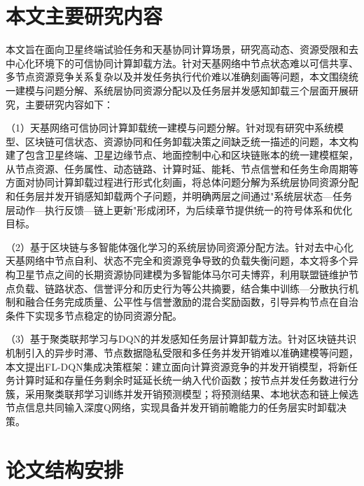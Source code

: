 \section{本文主要研究内容}

本文旨在面向卫星终端试验任务和天基协同计算场景，研究高动态、资源受限和去中心化环境下的可信协同计算卸载方法。针对天基网络中节点状态难以可信共享、多节点资源竞争关系复杂以及并发任务执行代价难以准确刻画等问题，本文围绕统一建模与问题分解、系统层协同资源分配以及任务层并发感知卸载三个层面开展研究，主要研究内容如下：

（1）天基网络可信协同计算卸载统一建模与问题分解。针对现有研究中系统模型、区块链可信状态、资源协同和任务卸载决策之间缺乏统一描述的问题，本文构建了包含卫星终端、卫星边缘节点、地面控制中心和区块链账本的统一建模框架，从节点资源、任务属性、动态链路、计算时延、能耗、节点信誉和任务生命周期等方面对协同计算卸载过程进行形式化刻画，将总体问题分解为系统层协同资源分配和任务层并发开销感知卸载两个子问题，并明确两层之间通过"系统层状态—任务层动作—执行反馈—链上更新"形成闭环，为后续章节提供统一的符号体系和优化目标。

（2）基于区块链与多智能体强化学习的系统层协同资源分配方法。针对去中心化天基网络中节点自利、状态不完全和资源竞争导致的负载失衡问题，本文将多个异构卫星节点之间的长期资源协同建模为多智能体马尔可夫博弈，利用联盟链维护节点负载、链路状态、信誉评分和历史行为等公共摘要，结合集中训练—分散执行机制和融合任务完成质量、公平性与信誉激励的混合奖励函数，引导异构节点在自治条件下实现多节点稳定的协同资源分配。

（3）基于聚类联邦学习与DQN的并发感知任务层计算卸载方法。针对区块链共识机制引入的异步时滞、节点数据隐私受限和多任务并发开销难以准确建模等问题，本文提出FL-DQN集成决策框架：建立面向计算资源竞争的并发开销模型，将新任务计算时延和存量任务剩余时延延长统一纳入代价函数；按节点并发任务数进行分簇，采用聚类联邦学习训练并发开销预测模型；将预测结果、本地状态和链上候选节点信息共同输入深度Q网络，实现具备并发开销前瞻能力的任务层实时卸载决策。

\section{论文结构安排}

